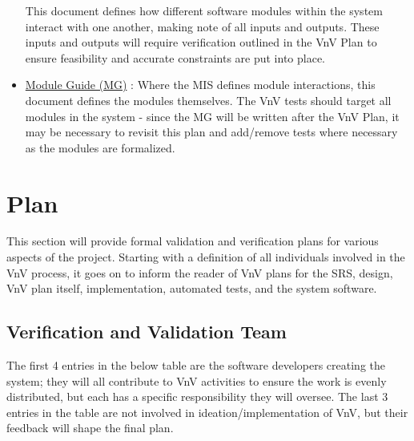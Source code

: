 \documentclass[12pt, titlepage]{article}
\begin{document}
\begin{itemize}
  This document defines how different software modules within the system interact with one another, making note of all inputs and outputs. These inputs 
  and outputs will require verification outlined in the VnV Plan to ensure feasibility and accurate constraints are put into place.
  \item \href{https://github.com/emilyperica/ScoreGen/blob/main/docs/Design/SoftArchitecture/MG.pdf}{Module Guide (MG)} \citep*{ScoreGenMG}:
  Where the MIS defines module interactions, this document defines the modules themselves. The VnV tests should target all modules in 
  the system - since the MG will be written after the VnV Plan, it may be necessary to revisit this plan and add/remove tests where necessary 
  as the modules are formalized.
\end{itemize}


\section{Plan}

This section will provide formal validation and verification plans for various aspects of the project. 
Starting with a definition of all individuals involved in the VnV process, it goes on to inform the 
reader of VnV plans for the SRS, design, VnV plan itself, implementation, automated tests, and the 
system software.

\subsection{Verification and Validation Team}

The first 4 entries in the below table are the software developers creating the system; they will all 
contribute to VnV activities to ensure the work is evenly distributed, but each has a specific responsibility 
they will oversee. The last 3 entries in the table are not involved in ideation/implementation of VnV, but 
their feedback will shape the final plan.
\end{document}
